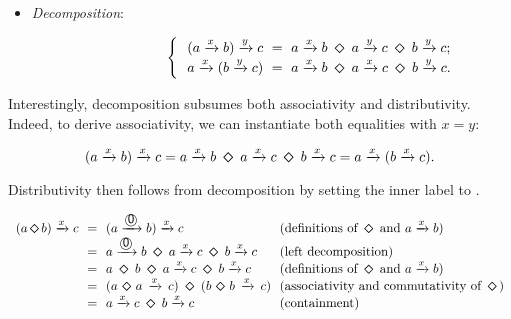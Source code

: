\documentclass[english,submission]{programming}
\newcommand{\zero}{\raisebox{-0.2mm}{\textcircled{\textsf{0}}}\xspace}
\newcommand{\dia}{\,\text{\raisebox{-0.3mm}{\Large $\diamond$}}\,}
\begin{document}
\vspace{5mm}
\begin{itemize}
    \item \emph{Decomposition}:

          \vspace{-16.3mm}\begin{equation*}
            \hspace{22.5mm}\begin{cases}
                \ \ (a \xrightarrow{x} b) \xrightarrow{y} c\ =\ a \xrightarrow{x} b\ \dia\ a \xrightarrow{y} c\ \dia\ b \xrightarrow{y} c;\\
                \ \ a \xrightarrow{x} (b \xrightarrow{y} c)\ =\ a \xrightarrow{x} b\ \dia\ a \xrightarrow{x} c\ \dia\ b \xrightarrow{y} c.\\
            \end{cases}
          \end{equation*}
\end{itemize}

\noindent
Interestingly, decomposition subsumes both associativity and distributivity.
Indeed, to derive associativity, we can instantiate both equalities with
$x = y$:

\vspace{-5mm}
\begin{equation*}
(a \xrightarrow{x} b) \xrightarrow{x} c = a \xrightarrow{x} b\ \dia\ a \xrightarrow{x} c\ \dia\ b \xrightarrow{x} c = a \xrightarrow{x} (b \xrightarrow{x} c).
\end{equation*}
\vspace{-5mm}

\noindent
Distributivity then follows from decomposition by setting the inner label to
\zero.

\vspace{-5mm}
\begin{equation*}
\begin{array}{rcll}
(a \dia b) \xrightarrow{x} c &\!\!=\!\!& (a \xrightarrow{\zero} b) \xrightarrow{x} c &\!\!\text{(definitions of $\dia$ and $a \xrightarrow{x} b$)}\\
 &\!\!=\!\!& a \xrightarrow{\zero} b\ \dia\ a \xrightarrow{x} c\ \dia\ b \xrightarrow{x} c &\!\!\text{(left decomposition)}\\
 &\!\!=\!\!& a\ \dia\ b\ \dia\ a \xrightarrow{x} c\ \dia\ b \xrightarrow{x} c &\!\!\text{(definitions of $\dia$ and $a \xrightarrow{x} b$)}\\
 &\!\!=\!\!& (a\,\dia\,a\,\xrightarrow{x}\,c)\ \dia\ (b\,\dia\,b\,\xrightarrow{x}\,c) &\!\!\text{(associativity and commutativity of \dia)}\\
 &\!\!=\!\!& a \xrightarrow{x} c\ \dia\ b \xrightarrow{x} c &\!\!\text{(containment)}
\end{array}
\end{equation*}
\vspace{-3mm}
\end{document}

